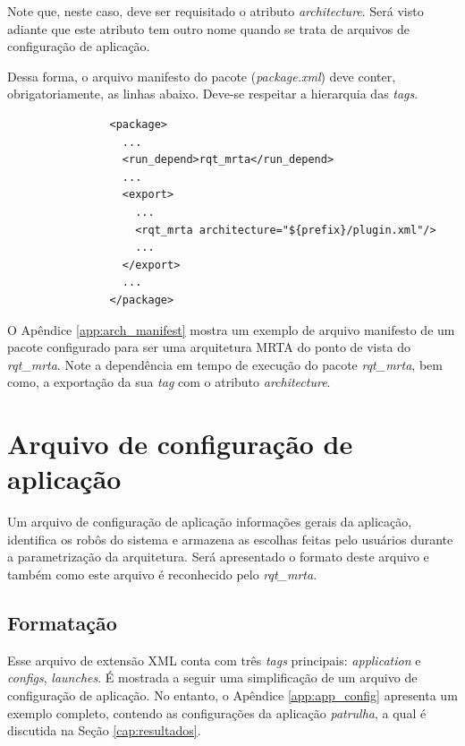             Note que, neste caso, deve ser requisitado o atributo \textit{architecture}. Será visto adiante que este atributo tem outro nome quando se trata de arquivos de configuração de aplicação.
            
            Dessa forma, o arquivo manifesto do pacote (\textit{package.xml}) deve conter, obrigatoriamente, as linhas abaixo. Deve-se respeitar a hierarquia das \textit{tags}.
            
            \begin{lstlisting}
                <package>
                  ...
                  <run_depend>rqt_mrta</run_depend>
                  ...
                  <export>
                    ...
                    <rqt_mrta architecture="${prefix}/plugin.xml"/>
                    ...
                  </export>
                  ...
                </package>
            \end{lstlisting}
            
            O Apêndice \ref{app:arch_manifest} mostra um exemplo de arquivo manifesto de um pacote configurado para ser uma arquitetura MRTA do ponto de vista do \textit{rqt\_mrta}. Note a dependência em tempo de execução do pacote \textit{rqt\_mrta}, bem como, a exportação da sua \textit{tag} com o atributo \textit{architecture}.
    
    \section{Arquivo de configuração de aplicação} \label{sec:app_config}
        Um arquivo de configuração de aplicação informações gerais da aplicação, identifica os robôs do sistema e armazena as escolhas feitas pelo usuários durante a parametrização da arquitetura. Será apresentado o formato deste arquivo e também como este arquivo é reconhecido pelo \textit{rqt\_mrta}.
        
        \subsection{Formatação} \label{subsec:app_config_fmt}
            Esse arquivo de extensão XML conta com três \textit{tags} principais: \textit{application} e \textit{configs}, \textit{launches}. É mostrada a seguir uma simplificação de um arquivo de configuração de aplicação. No entanto, o Apêndice \ref{app:app_config} apresenta um exemplo completo, contendo as configurações da aplicação \textit{patrulha}, a qual é discutida na Seção \ref{cap:resultados}.
            
